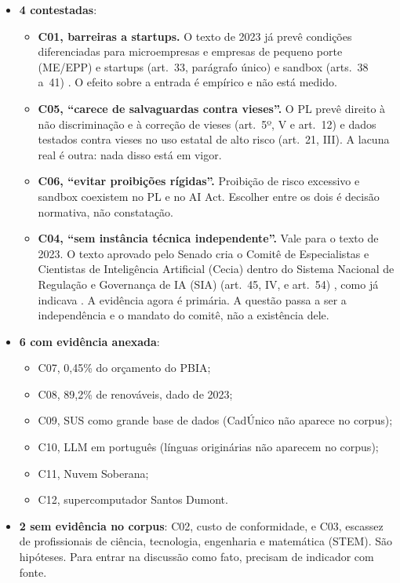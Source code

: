 \documentclass[12pt,a4paper,oneside,english,brazil]{abntex2}
\begin{document}
\begin{itemize}[leftmargin=*]
  \item \textbf{4 contestadas}:
  \begin{itemize}
    \item \textbf{C01, barreiras a startups.} O texto de 2023 já prevê condições diferenciadas para microempresas e empresas de pequeno porte (ME/EPP) e startups (art.~33, parágrafo único) e sandbox (arts.~38 a~41) \cite{pl2338-2023}. O efeito sobre a entrada é empírico e não está medido.
    \item \textbf{C05, ``carece de salvaguardas contra vieses''.} O PL prevê direito à não discriminação e à correção de vieses (art.~5º, V e art.~12) e dados testados contra vieses no uso estatal de alto risco (art.~21, III). A lacuna real é outra: nada disso está em vigor.
    \item \textbf{C06, ``evitar proibições rígidas''.} Proibição de risco excessivo e sandbox coexistem no PL e no AI Act. Escolher entre os dois é decisão normativa, não constatação.
    \item \textbf{C04, ``sem instância técnica independente''.} Vale para o texto de 2023. O texto aprovado pelo Senado cria o Comitê de Especialistas e Cientistas de Inteligência Artificial (Cecia) dentro do Sistema Nacional de Regulação e Governança de IA (SIA) (art.~45, IV, e art.~54) \cite{pl2338-2024}, como já indicava . A evidência agora é primária. A questão passa a ser a independência e o mandato do comitê, não a existência dele.
  \end{itemize}
  \item \textbf{6 com evidência anexada}:
  \begin{itemize}
    \item C07, 0,45\% do orçamento do PBIA;
    \item C08, 89,2\% de renováveis, dado de 2023;
    \item C09, SUS como grande base de dados (CadÚnico não aparece no corpus);
    \item C10, LLM em português (línguas originárias não aparecem no corpus);
    \item C11, Nuvem Soberana;
    \item C12, supercomputador Santos Dumont.
  \end{itemize}
  \item \textbf{2 sem evidência no corpus}: C02, custo de conformidade, e C03, escassez de profissionais de ciência, tecnologia, engenharia e matemática (STEM). São hipóteses. Para entrar na discussão como fato, precisam de indicador com fonte.
\end{itemize}
\end{document}
